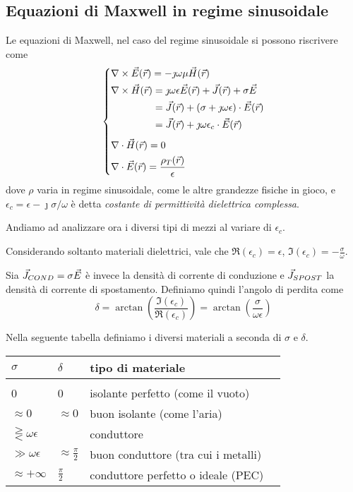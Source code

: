 \subsection{Equazioni di Maxwell in regime sinusoidale}
Le equazioni di Maxwell, nel caso del regime sinusoidale si possono riscrivere come
\begin{equation}\begin{dcases}
	\nabla\times\vec{E}(\vec{r}) = -\jmath \omega \mu\vec{H}(\vec{r}) \\
	\begin{aligned}[b]
		\nabla\times\vec{H}(\vec{r}) &= \jmath	\omega \epsilon \vec{E}(\vec{r}) + \vec{J}(\vec{r}) + \sigma\vec{E} \\
		&= \vec{J}(\vec{r}) +(\sigma + \jmath \omega \epsilon) \cdot \vec{E}(\vec{r}) \\
		&= \vec{J}(\vec{r}) +\jmath \omega \epsilon_c \cdot \vec{E}(\vec{r}) \\
	\end{aligned} \\
	\nabla\cdot\vec{H}(\vec{r})=0\\
	\nabla\cdot \vec{E}(\vec{r}) = \frac{\rho_T(\vec{r})}{\epsilon}
\end{dcases}\end{equation}
dove $\rho$ varia in regime sinusoidale, come le altre grandezze fisiche in gioco, e $\epsilon_c = \epsilon -\jmath\sigma / \omega$ è detta \emph{costante di permittività dielettrica complessa}.

Andiamo ad analizzare ora i diversi tipi di mezzi al variare di $\epsilon_c$.

\begin{definition}
	Considerando soltanto materiali dielettrici, vale che $\Re(\epsilon_c) = \epsilon$, $\Im(\epsilon_c) = -\frac{\sigma}{\omega}$.

	Sia $\vec{J}_{COND} = \sigma \vec{E}$ è invece la densità di corrente di conduzione e $\vec{J}_{SPOST}$ la densità di corrente di spostamento.
	Definiamo quindi l'angolo di perdita come
	\begin{equation}
		\delta = \arctan \left(\frac{\Im(\epsilon_c)}{\Re(\epsilon_c)}\right) = \arctan\left(\frac{\sigma}{\omega \epsilon}\right)
		\end{equation}
\end{definition}

Nella seguente tabella definiamo i diversi materiali a seconda di $\sigma$ e $\delta$.
\begin{table}[h] \label{tab:conductors}
\centering
\begin{tabular}{llll}
	$\sigma$ & $\delta$ & tipo di materiale \\
	\hline \\
	0 & 0 & isolante perfetto (come il vuoto) \\
	$\approx 0$ & $\approx 0$ & buon isolante (come l'aria) \\
	$\gtreqless \omega \epsilon $ & & conduttore \\
	$\gg \omega \epsilon$ & $\approx \frac{\pi}{2}$ & buon conduttore (tra cui i metalli) \\
	$\approx +\infty$ & $\frac{\pi}{2}$ & conduttore perfetto o ideale (PEC)
\end{tabular}
\end{table}

